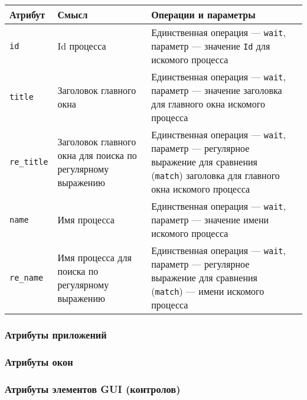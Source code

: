 \documentclass[11pt]{book} %
\begin{document}
	\begin{tabular}{|p{60pt}|p{140pt}|p{140pt}|p{60pt}|}\hline
		\textbf{Атрибут} & \textbf{Смысл} & \textbf{Операции и параметры} \\ \hline
		\verb|id| & Id процесса & Единственная операция --- \verb|wait|, параметр --- значение \verb"Id" для искомого процесса \\ \hline

		\verb|title| & Заголовок главного окна & Единственная операция --- \verb|wait|, параметр --- значение заголовка для главного окна искомого процесса \\ \hline

		\verb|re_title| & Заголовок главного окна для поиска по регулярному выражению & Единственная операция --- \verb|wait|, параметр --- регулярное выражение для сравнения (\verb|match|) заголовка для главного окна искомого процесса \\ \hline
				
		\verb|name| & Имя процесса & Единственная операция --- \verb|wait|, параметр --- значение имени искомого процесса \\ \hline

		\verb|re_name| & Имя процесса для поиска по регулярному выражению & Единственная операция --- \verb|wait|, параметр --- регулярное выражение для сравнения (\verb|match|) --- имени искомого процесса \\ \hline
				
	\end{tabular}


\subsubsection{Атрибуты приложений}
\subsubsection{Атрибуты окон}
\subsubsection{Атрибуты элементов GUI (контролов)}
\end{document}
